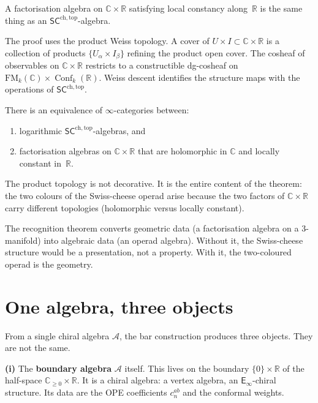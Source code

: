 \documentclass[11pt]{article}
\newcommand{\cA}{\mathcal{A}}
\newcommand{\C}{\mathbb{C}}
\newcommand{\R}{\mathbb{R}}
\newcommand{\Einf}{\mathsf{E}_{\infty}}
\newcommand{\SCchtop}{\mathsf{SC}^{\mathrm{ch,top}}}
\newcommand{\FM}{\mathrm{FM}}
\DeclareMathOperator{\Conf}{Conf}
\begin{document}
A factorisation algebra on $\C \times \R$ satisfying local
constancy along~$\R$ is the same thing as an $\SCchtop$-algebra.

The proof uses the product Weiss topology.  A cover of
$U \times I \subset \C \times \R$ is a collection of products
$\{U_\alpha \times I_\beta\}$ refining the product open cover.
The cosheaf of observables on $\C \times \R$ restricts to a
constructible dg-cosheaf on $\FM_k(\C) \times \Conf_k(\R)$.
Weiss descent identifies the structure maps with the operations
of $\SCchtop$.

\begin{theorem}
\label{thm:recognition-wn}
There is an equivalence of $\infty$-categories between:
\begin{enumerate}[label=\textup{(\roman*)},nosep]
\item logarithmic $\SCchtop$-algebras, and
\item factorisation algebras on $\C \times \R$ that are
  holomorphic in $\C$ and locally constant in~$\R$.
\end{enumerate}
\end{theorem}

\noindent
The product topology is not decorative.  It is the entire content
of the theorem: the two colours of the Swiss-cheese operad arise
because the two factors of $\C \times \R$ carry different
topologies (holomorphic versus locally constant).

\medskip

The recognition theorem converts geometric data (a factorisation
algebra on a $3$-manifold) into algebraic data (an operad
algebra).  Without it, the Swiss-cheese structure would be a
presentation, not a property.  With it, the two-coloured operad
is the geometry.


\section{One algebra, three objects}
\label{sec:three-objects}

From a single chiral algebra $\cA$, the bar construction
produces three objects.  They are not the same.

\medskip

\noindent
\textbf{(i)} The \textbf{boundary algebra} $\cA$ itself.  This
lives on the boundary $\{0\} \times \R$ of the half-space
$\C_{\geq 0} \times \R$.  It is a chiral algebra: a vertex
algebra, an $\Einf$-chiral structure.  Its data are the OPE
coefficients $c_n^{ab}$ and the conformal weights.
\end{document}
